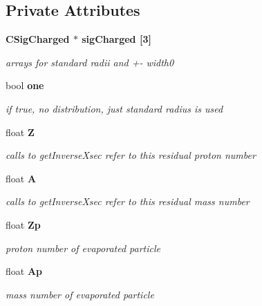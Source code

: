\subsection*{Private Attributes}
\begin{CompactItemize}
\item 
\bf{CSig\-Charged} $\ast$ \bf{sig\-Charged} [3]\label{classCSigBarDist_5e86ed64783828fa440859e380b1d1da}

\begin{CompactList}\small\item\em arrays for standard radii and +- width0 \item\end{CompactList}\item 
bool \bf{one}\label{classCSigBarDist_61ce73d84bfda0b0d2d29c85fb5b20fd}

\begin{CompactList}\small\item\em if true, no distribution, just standard radius is used \item\end{CompactList}\item 
float \bf{Z}\label{classCSigBarDist_9a9699ea3c6cd8270ed564c136c5007a}

\begin{CompactList}\small\item\em calls to get\-Inverse\-Xsec refer to this residual proton number \item\end{CompactList}\item 
float \bf{A}\label{classCSigBarDist_20659289535a2d303e39aff96e957ff9}

\begin{CompactList}\small\item\em calls to get\-Inverse\-Xsec refer to this residual mass number \item\end{CompactList}\item 
float \bf{Zp}\label{classCSigBarDist_257fd637d8c84837cb7df124d26c7bc0}

\begin{CompactList}\small\item\em proton number of evaporated particle \item\end{CompactList}\item 
float \bf{Ap}\label{classCSigBarDist_901d950d11630943e11749fc21cbeeb3}

\begin{CompactList}\small\item\em mass number of evaporated particle \item\end{CompactList}\end{CompactItemize}
